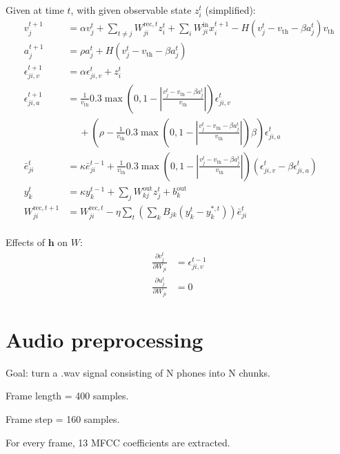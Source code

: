\documentclass{article}
\begin{document}
Given at time $t$, with given observable state $z_i^t$ (simplified):
\begin{align}
v^{t+1}_j &= \alpha v_j^t + \sum_{t\neq j} W^{\text{rec}, t}_{ji} z_i^t + \sum_i W^\text{in}_{ji}x_i^{t+1} - H\left(v_j^t-v_\text{th}-\beta a^t_j\right)v_\text{th}\\
a^{t+1}_j &= \rho a_j^t + H\left(v_j^t-v_\text{th}-\beta a^t_j\right)\\
\epsilon_{ji,v}^{t+1} &= \alpha\epsilon_{ji,v}^t + z_i^t\\
\epsilon_{ji,a}^{t+1} &= \frac{1}{v_\text{th}}0.3\max\left(0, 1-\left|\frac{v_j^t-v_\text{th}-\beta a^t_j}{v_\text{th}}\right|\right)\epsilon^t_{ji,v} \\ &\quad \ + \left(\rho-\frac{1}{v_\text{th}}0.3\max\left(0, 1-\left|\frac{v_j^t-v_\text{th}-\beta a^t_j}{v_\text{th}}\right|\right)\beta\right)\epsilon^t_{ji,a}\\
\bar{e}^t_{ji} &= \kappa\bar{e}^{t-1}_{ji} + \frac{1}{v_\text{th}}0.3\max\left(0, 1-\left|\frac{v_j^t-v_\text{th}-\beta a^t_j}{v_\text{th}}\right|\right)\left(\epsilon^t_{ji,v} - \beta\epsilon^t_{ji,a}\right)\\
y^t_k &= \kappa y^{t-1}_k + \sum_j W^\text{out}_{kj}z^t_j+b^\text{out}_k\\
W^{\text{rec}, t+1}_{ji} &= W^{\text{rec}, t}_{ji} -\eta\sum_t\left(\sum_kB_{jk}\left(y_k^t-y_k^{*,t}\right)\right)\bar{e}^t_{ji}\\
\end{align}



Effects of $\mathbf{h}$ on $W$:
\begin{align}
\frac{\partial v_j^t}{\partial W_{ji}} &= \epsilon_{ji,v}^{t-1} \\
\frac{\partial u_j^t}{\partial W_{ji}} &= 0
\end{align}












\newpage
\section{Audio preprocessing}
Goal: turn a .wav signal consisting of N phones into N chunks.

Frame length = 400 samples.

Frame step = 160 samples.

For every frame, 13 MFCC coefficients are extracted.
\end{document}

